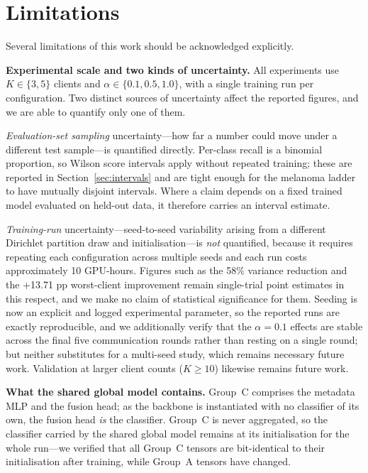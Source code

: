 \documentclass{ieeeaccess}
\begin{document}
\section{Limitations}

Several limitations of this work should be acknowledged explicitly.

\textbf{Experimental scale and two kinds of uncertainty.} All experiments use $K \in \{3, 5\}$ clients and $\alpha \in \{0.1, 0.5, 1.0\}$, with a single training run per configuration. Two distinct sources of uncertainty affect the reported figures, and we are able to quantify only one of them.

\emph{Evaluation-set sampling} uncertainty---how far a number could move under a different test sample---is quantified directly. Per-class recall is a binomial proportion, so Wilson score intervals apply without repeated training; these are reported in Section~\ref{sec:intervals} and are tight enough for the melanoma ladder to have mutually disjoint intervals. Where a claim depends on a fixed trained model evaluated on held-out data, it therefore carries an interval estimate.

\emph{Training-run} uncertainty---seed-to-seed variability arising from a different Dirichlet partition draw and initialisation---is \emph{not} quantified, because it requires repeating each configuration across multiple seeds and each run costs approximately 10 GPU-hours. Figures such as the 58\% variance reduction and the +13.71 pp worst-client improvement remain single-trial point estimates in this respect, and we make no claim of statistical significance for them. Seeding is now an explicit and logged experimental parameter, so the reported runs are exactly reproducible, and we additionally verify that the $\alpha = 0.1$ effects are stable across the final five communication rounds rather than resting on a single round; but neither substitutes for a multi-seed study, which remains necessary future work. Validation at larger client counts ($K \ge 10$) likewise remains future work.

\textbf{What the shared global model contains.} Group~C comprises the metadata MLP and the fusion head; as the backbone is instantiated with no classifier of its own, the fusion head \emph{is} the classifier. Group~C is never aggregated, so the classifier carried by the shared global model remains at its initialisation for the whole run---we verified that all Group~C tensors are bit-identical to their initialisation after training, while Group~A tensors have changed.
\end{document}
